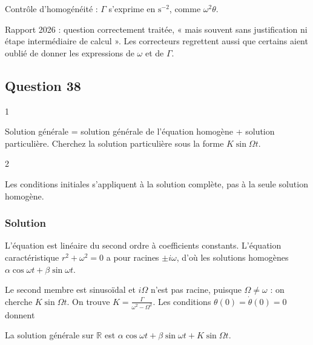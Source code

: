 \documentclass[11pt,a4paper]{article}
\newcommand{\equationajustee}[1]{%
  \sbox{\boiteequation}{$\displaystyle #1$}%
  \ifdim\wd\boiteequation>\linewidth
    \[\resizebox{\linewidth}{!}{\usebox{\boiteequation}}\]%
  \else
    \[#1\]%
  \fi}
\begin{document}
Contrôle d'homogénéité : \(\Gamma\) s'exprime en \(\mathrm{s^{-2}}\), comme \(\omega^2\theta\).

\begin{jury}

Rapport 2026 : question correctement traitée, « mais souvent sans justification ni étape intermédiaire de calcul ». Les correcteurs regrettent aussi que certains aient oublié de donner les expressions de \(\omega\) et de \(\Gamma\).

\end{jury}

\hypertarget{question-38}{%
\subsection{Question 38}\label{question-38}}

\begin{indication}{1}

Solution générale = solution générale de l'équation homogène + solution particulière. Cherchez la solution particulière sous la forme \(K\sin\Omega t\).

\end{indication}

\begin{indication}{2}

Les conditions initiales s'appliquent à la solution complète, pas à la seule solution homogène.

\end{indication}

\hypertarget{solution-37}{%
\subsubsection{Solution}\label{solution-37}}

L'équation est linéaire du second ordre à coefficients constants. L'équation caractéristique \(r^2+\omega^2=0\) a pour racines \(\pm i\omega\), d'où les solutions homogènes \(\alpha\cos\omega t+\beta\sin\omega t\).

Le second membre est sinusoïdal et \(i\Omega\) n'est pas racine, puisque \(\Omega\neq\omega\) : on cherche \(K\sin\Omega t\). On trouve \(K=\frac{\Gamma}{\omega^2-\Omega^2}\). Les conditions \(\theta(0)=\dot\theta(0)=0\) donnent

\equationajustee{\boxed{\theta(t)=\frac{\Gamma}{\omega^2-\Omega^2}\Big(\sin\Omega t-\frac\Omega\omega\sin\omega t\Big)}}

La solution générale sur \(\mathbb{R}\) est \(\alpha\cos\omega t+\beta\sin\omega t+K\sin\Omega t\).
\end{document}
